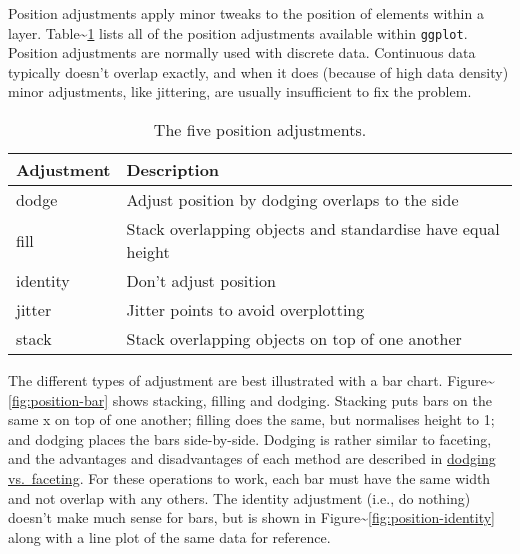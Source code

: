 
Position adjustments apply minor tweaks to the position of elements
within a layer. Table\textasciitilde{}\ref{fig:position} lists all of
the position adjustments available within \texttt{ggplot}. Position
adjustments are normally used with discrete data. Continuous data
typically doesn't overlap exactly, and when it does (because of high
data density) minor adjustments, like jittering, are usually
insufficient to fix the problem. 
 

\begin{table}
  \begin{center}
  \begin{tabular}{ll}
    \toprule
    Adjustment & Description  \\
    \midrule
    dodge     & Adjust position by dodging overlaps to the side \\
    fill      & Stack overlapping objects and standardise have equal height\\
    identity  & Don't adjust position \\
    jitter    & Jitter points to avoid overplotting \\
    stack     & Stack overlapping objects on top of one another \\
    \bottomrule
  \end{tabular}
  \end{center}
  \caption{The five position adjustments.}
  \label{fig:position}
\end{table}

The different types of adjustment are best illustrated with a bar chart.
Figure\textasciitilde{}\ref{fig:position-bar} shows stacking, filling
and dodging. Stacking puts bars on the same x on top of one another;
filling does the same, but normalises height to 1; and dodging places
the bars side-by-side. Dodging is rather similar to faceting, and the
advantages and disadvantages of each method are described in
\hyperref[sub:dodge-vs-facet]{dodging vs.~faceting}. For these
operations to work, each bar must have the same width and not overlap
with any others. The identity adjustment (i.e., do nothing) doesn't make
much sense for bars, but is shown in
Figure\textasciitilde{}\ref{fig:position-identity} along with a line
plot of the same data for reference. 
 
  

